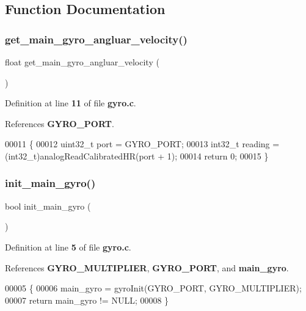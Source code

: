 \subsection{Function Documentation}
\mbox{\label{gyro_8h_aec0963ebe3eb6cdfd7edaf486bbb0a87}} 
\subsubsection{get\+\_\+main\+\_\+gyro\+\_\+angluar\+\_\+velocity()}
{\footnotesize\ttfamily float get\+\_\+main\+\_\+gyro\+\_\+angluar\+\_\+velocity (\begin{DoxyParamCaption}{ }\end{DoxyParamCaption})}



Definition at line \textbf{ 11} of file \textbf{ gyro.\+c}.



References \textbf{ G\+Y\+R\+O\+\_\+\+P\+O\+RT}.


\begin{DoxyCode}
00011                                        \{
00012   uint32\_t port = GYRO_PORT;
00013   int32\_t reading = (int32\_t)analogReadCalibratedHR(port + 1);
00014     \textcolor{keywordflow}{return} 0;
00015 \}
\end{DoxyCode}
\mbox{\label{gyro_8h_a47c0a78a867be91a28e278bf433d699c}} 
\subsubsection{init\+\_\+main\+\_\+gyro()}
{\footnotesize\ttfamily bool init\+\_\+main\+\_\+gyro (\begin{DoxyParamCaption}{ }\end{DoxyParamCaption})}



Definition at line \textbf{ 5} of file \textbf{ gyro.\+c}.



References \textbf{ G\+Y\+R\+O\+\_\+\+M\+U\+L\+T\+I\+P\+L\+I\+ER}, \textbf{ G\+Y\+R\+O\+\_\+\+P\+O\+RT}, and \textbf{ main\+\_\+gyro}.


\begin{DoxyCode}
00005                       \{
00006   main_gyro = gyroInit(GYRO_PORT, GYRO_MULTIPLIER);
00007   \textcolor{keywordflow}{return} main_gyro != NULL;
00008 \}
\end{DoxyCode}
